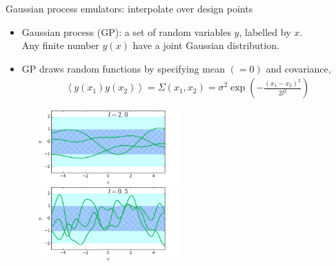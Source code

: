 \documentclass[11pt]{beamer}
\begin{document}
\begin{frame}{Gaussian process emulators: interpolate over design points}
\begin{itemize}
\item Gaussian process (GP): a set of random variables $y$, labelled by $x$. \\
 Any finite number $y(x)$ have a joint Gaussian distribution.
\item  GP draws random functions by specifying mean $(=0)$ and covariance,
\begin{eqnarray}
\nonumber
\left\langle y(x_1) y(x_2)\right\rangle = \Sigma(x_1, x_2) = \sigma^2 \exp\left(-\frac{\left(x_1 - x_2\right)^2}{2l^2}\right)
\end{eqnarray}
\end{itemize}
\begin{center}
\begin{figure}
\includegraphics[width = 0.5\textwidth]{./pics/GP-1.png}
\includegraphics[width = 0.5\textwidth]{./pics/GP-11.png}
\end{figure}
\end{center}
\end{frame}
\end{document}
